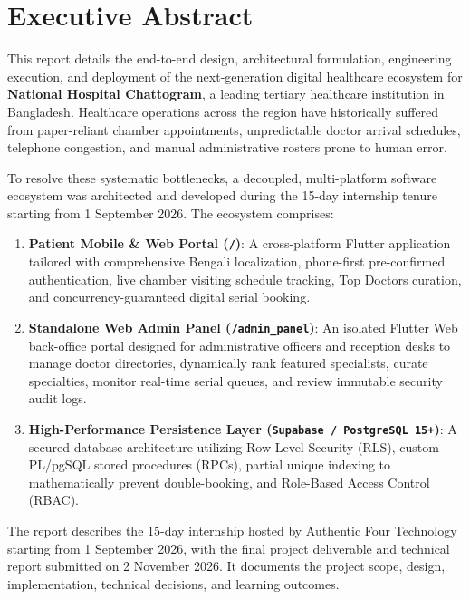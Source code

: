 \documentclass[11pt,a4paper,oneside]{report}
\begin{document}
\clearpage

\chapter*{Executive Abstract}
This report details the end-to-end design, architectural formulation, engineering execution, and deployment of the next-generation digital healthcare ecosystem for \textbf{National Hospital Chattogram}, a leading tertiary healthcare institution in Bangladesh. Healthcare operations across the region have historically suffered from paper-reliant chamber appointments, unpredictable doctor arrival schedules, telephone congestion, and manual administrative rosters prone to human error.

To resolve these systematic bottlenecks, a decoupled, multi-platform software ecosystem was architected and developed during the 15-day internship tenure starting from 1 September 2026. The ecosystem comprises:
\begin{enumerate}
    \item \textbf{Patient Mobile \& Web Portal (\texttt{/})}: A cross-platform Flutter application tailored with comprehensive Bengali localization, phone-first pre-confirmed authentication, live chamber visiting schedule tracking, Top Doctors curation, and concurrency-guaranteed digital serial booking.
    \item \textbf{Standalone Web Admin Panel (\texttt{/admin\_panel})}: An isolated Flutter Web back-office portal designed for administrative officers and reception desks to manage doctor directories, dynamically rank featured specialists, curate specialties, monitor real-time serial queues, and review immutable security audit logs.
    \item \textbf{High-Performance Persistence Layer (\texttt{Supabase / PostgreSQL 15+})}: A secured database architecture utilizing Row Level Security (RLS), custom PL/pgSQL stored procedures (RPCs), partial unique indexing to mathematically prevent double-booking, and Role-Based Access Control (RBAC).
\end{enumerate}

The report describes the 15-day internship hosted by Authentic Four Technology starting from 1 September 2026, with the final project deliverable and technical report submitted on 2 November 2026. It documents the project scope, design, implementation, technical decisions, and learning outcomes.

\clearpage
\tableofcontents
\clearpage
\listoffigures
\listoftables
\clearpage
\end{document}
